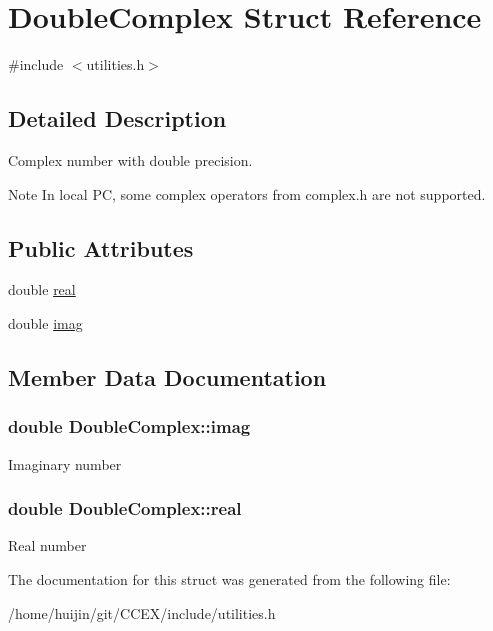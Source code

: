 \hypertarget{structDoubleComplex}{\section{Double\-Complex Struct Reference}
\label{structDoubleComplex}
}


{\ttfamily \#include $<$utilities.\-h$>$}



\subsection{Detailed Description}
Complex number with double precision. 





\begin{DoxyNote}{Note}
In local P\-C, some complex operators from complex.\-h are not supported. 
\end{DoxyNote}
\subsection*{Public Attributes}
\begin{DoxyCompactItemize}
\item 
double \hyperlink{structDoubleComplex_a59acbb424a325b3510f85b75642bc5e4}{real}
\item 
double \hyperlink{structDoubleComplex_aa3fa36b7221c819a1ee1f642529b5529}{imag}
\end{DoxyCompactItemize}


\subsection{Member Data Documentation}
\hypertarget{structDoubleComplex_aa3fa36b7221c819a1ee1f642529b5529}{
\subsubsection[{imag}]{\setlength{\rightskip}{0pt plus 5cm}double Double\-Complex\-::imag}}\label{structDoubleComplex_aa3fa36b7221c819a1ee1f642529b5529}
Imaginary number \hypertarget{structDoubleComplex_a59acbb424a325b3510f85b75642bc5e4}{
\subsubsection[{real}]{\setlength{\rightskip}{0pt plus 5cm}double Double\-Complex\-::real}}\label{structDoubleComplex_a59acbb424a325b3510f85b75642bc5e4}
Real number 

The documentation for this struct was generated from the following file\-:\begin{DoxyCompactItemize}
\item 
/home/huijin/git/\-C\-C\-E\-X/include/utilities.\-h\end{DoxyCompactItemize}
